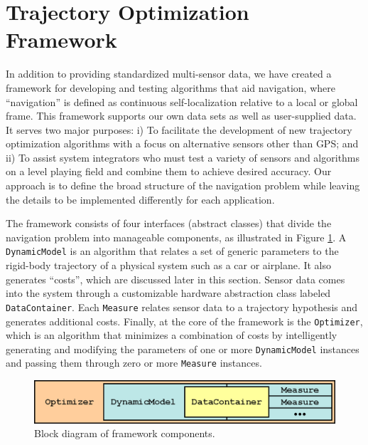 \section{Trajectory Optimization Framework}\label{sec:framework}
In addition to providing standardized multi-sensor data, we have created a framework for developing and testing algorithms that aid navigation, where ``navigation'' is defined as continuous self-localization relative to a local or global frame. This framework supports our own data sets as well as user-supplied data. It serves two major purposes: i) To facilitate the development of new trajectory optimization algorithms with a focus on alternative sensors other than GPS; and ii) To assist system integrators who must test a variety of sensors and algorithms on a level playing field and combine them to achieve desired accuracy. Our approach is to define the broad structure of the navigation problem while leaving the details to be implemented differently for each application.

The framework consists of four interfaces (abstract classes) that divide the navigation problem into manageable components, as illustrated in Figure \ref{fig:components}. A \texttt{\small{DynamicModel}} is an algorithm that relates a set of generic parameters to the rigid-body trajectory of a physical system such as a car or airplane. It also generates ``costs'', which are discussed later in this section. Sensor data comes into the system through a customizable hardware abstraction class labeled \texttt{\small{DataContainer}}. Each \texttt{\small{Measure}} relates sensor data to a trajectory hypothesis and generates additional costs. Finally, at the core of the framework is the \texttt{\small{Optimizer}}, which is an algorithm that minimizes a combination of costs by intelligently generating and modifying the parameters of one or more \texttt{\small{DynamicModel}} instances and passing them through zero or more \texttt{\small{Measure}} instances.

\begin{figure}[!htp]
  \begin{center}
  \includegraphics[width=0.97\linewidth]{SimpleBlockDiagram.png}
  \caption{\label{fig:components}Block diagram of framework components.}
  \end{center}
  \vspace{-15pt}
\end{figure}

